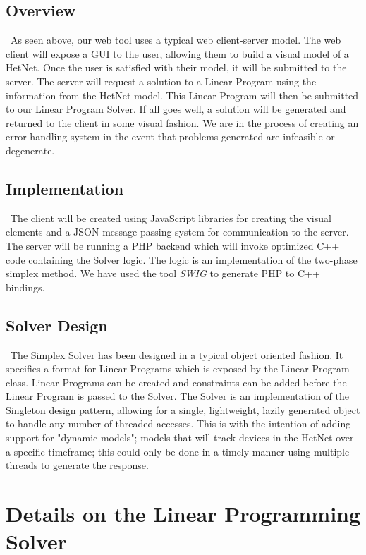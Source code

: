 \documentclass[11pt]{article}
\begin{document}
\subsection{Overview}
~\indent As seen above, our web tool uses a typical web client-server model. The web client
will expose a GUI to the user, allowing them to build a visual model of a 
HetNet. Once the user is satisfied with their model, it will be submitted to the 
server. The server will request a solution to a Linear Program using the information 
from the HetNet model. This Linear Program will then be submitted to our Linear
Program Solver. If all goes well, a solution will be generated and returned to 
the client in some visual fashion. We are in the process of creating an 
error handling system in the event that problems generated are infeasible or 
degenerate. 

\subsection{Implementation}
~\indent The client will be created using JavaScript libraries for creating the visual 
elements and a JSON message passing system for communication to the server.
The server will be running a PHP backend which will invoke optimized
C++ code containing the Solver logic. The logic is an implementation of the two-phase
simplex method. We have used the tool \textit{SWIG}\cite{swig} to generate  
PHP to C++ bindings. 

\subsection{Solver Design}
~\indent The Simplex Solver has been designed in a typical object oriented fashion. 
It specifies a format for Linear Programs which is exposed by the Linear Program
class. Linear Programs can be created and constraints can be added before 
the Linear Program is passed to the Solver. The Solver is an implementation of 
the Singleton design pattern, allowing for a single, lightweight, lazily generated 
object to handle any number of threaded accesses. This is with the intention of 
adding support for "dynamic models"; models that will track devices in the HetNet
over a specific timeframe; this could only be done in a timely manner using 
multiple threads to generate the response. 

\section{Details on the Linear Programming Solver}
\end{document}
